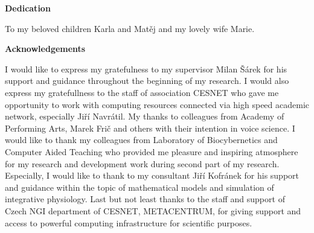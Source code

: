 
\newpage
{}

\begin{center}
\Large \textbf{Dedication}
\end{center} 
\vfill
\begin{center}
To my beloved children Karla and Matěj and my lovely wife Marie. 
\end{center} 
\vfill
\newpage
\mbox{}
\newpage
\begin{center}
\Large \textbf{Acknowledgements}
\end{center} 
I would like to express my gratefulness to my supervisor Milan Šárek for his support and guidance throughout the beginning of my research. 
I would also express my gratefullness to the staff of association CESNET who gave me opportunity to work with computing resources connected via high speed academic network, especially Jiří Navrátil. My thanks to colleagues from Academy of Performing Arts, Marek Frič and others with their intention in voice science. I would like to thank my colleagues from Laboratory of Biocybernetics and Computer Aided Teaching who provided me pleasure and inspiring atmosphere for my research and development work during second part of my research. Especially, I would like to thank to my consultant Jiří Kofránek for his support and guidance within the topic of mathematical models and simulation of integrative physiology.
Last but not least thanks to the staff and support of Czech NGI department of CESNET, METACENTRUM, for giving support and access to powerful computing infrastructure for scientific purposes.